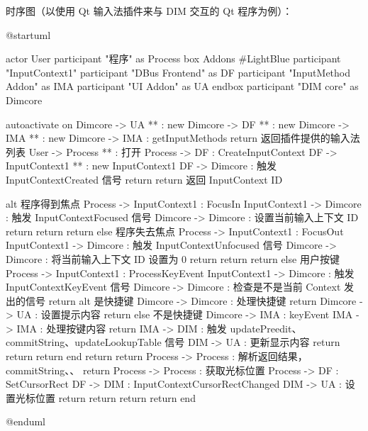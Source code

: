\documentclass{utart}
\begin{document}
        \pagebreak
        \par 时序图（以使用 Qt 输入法插件来与 DIM 交互的 Qt 程序为例）：

        \begin{plantuml}
        @startuml

        actor User
        participant "程序" as Process
        box Addons #LightBlue
        participant "InputContext1"
        participant "DBus Frontend" as DF
        participant "InputMethod Addon" as IMA
        participant "UI Addon" as UA
        endbox
        participant "DIM core" as Dimcore

        autoactivate on
        Dimcore -> UA ** : new
        Dimcore -> DF ** : new
        Dimcore -> IMA ** : new
        Dimcore -> IMA : getInputMethods
        return 返回插件提供的输入法列表
        User -> Process ** : 打开
        Process -> DF : CreateInputContext
        DF -> InputContext1 ** : new InputContext1
        DF -> Dimcore : 触发 InputContextCreated 信号
        return
        return 返回 InputContext ID

        alt 程序得到焦点
            Process -> InputContext1 : FocusIn
                InputContext1 -> Dimcore : 触发 InputContextFocused 信号
                    Dimcore -> Dimcore : 设置当前输入上下文 ID
                    return
                return
            return
        else 程序失去焦点
            Process -> InputContext1 : FocusOut
                InputContext1 -> Dimcore : 触发 InputContextUnfocused 信号
                    Dimcore -> Dimcore : 将当前输入上下文 ID 设置为 0
                    return
                return
            return
        else 用户按键
            Process -> InputContext1 : ProcessKeyEvent
                InputContext1 -> Dimcore : 触发 InputContextKeyEvent 信号
                    Dimcore -> Dimcore : 检查是不是当前 Context 发出的信号
                    return
                    alt 是快捷键
                        Dimcore -> Dimcore : 处理快捷键
                        return
                        Dimcore -> UA : 设置提示内容
                        return
                    else 不是快捷键
                        Dimcore -> IMA : keyEvent
                            IMA -> IMA : 处理按键内容
                            return
                            IMA -> DIM : 触发 updatePreedit、commitString、updateLookupTable 信号
                                DIM -> UA : 更新显示内容
                                return
                            return
                        return
                    end
                return
            return
            Process -> Process : 解析返回结果， commitString、\nupdatePreedit、\nforwardKey
            return
            Process -> Process : 获取光标位置
                Process -> DF : SetCursorRect
                    DF -> DIM : InputContextCursorRectChanged
                        DIM -> UA : 设置光标位置
                        return
                    return
                return
            return
        end

        @enduml
        \end{plantuml}
\end{document}
